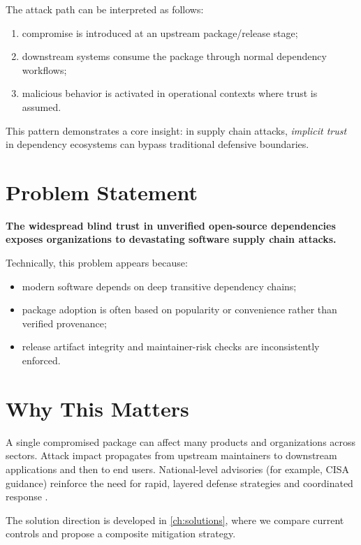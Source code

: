The attack path can be interpreted as follows:

\begin{enumerate}
\item compromise is introduced at an upstream package/release stage;
\item downstream systems consume the package through normal dependency workflows;
\item malicious behavior is activated in operational contexts where trust is assumed.
\end{enumerate}

This pattern demonstrates a core insight: in supply chain attacks, \emph{implicit trust}
in dependency ecosystems can bypass traditional defensive boundaries.

\section{Problem Statement}

\textbf{The widespread blind trust in unverified open-source dependencies exposes organizations
to devastating software supply chain attacks.}

Technically, this problem appears because:

\begin{itemize}
\item modern software depends on deep transitive dependency chains;
\item package adoption is often based on popularity or convenience rather than verified provenance;
\item release artifact integrity and maintainer-risk checks are inconsistently enforced.
\end{itemize}

\section{Why This Matters}

A single compromised package can affect many products and organizations across sectors.
Attack impact propagates from upstream maintainers to downstream applications and then to end users.
National-level advisories (for example, CISA guidance) reinforce the need for rapid,
layered defense strategies and coordinated response \citep{cisa2024shieldsup}.

The solution direction is developed in \cref{ch:solutions}, where we compare current controls
and propose a composite mitigation strategy.
